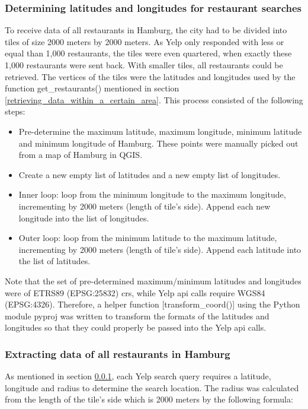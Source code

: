 \documentclass[a4paper, 11pt, oneside]{Thesis}  %
\begin{document}
\subsubsection{Determining latitudes and longitudes for restaurant searches}
\label{Determining_latitudes_and_longitudes_for_restaurant_searches}

To receive data of all restaurants in Hamburg, the city had to be divided into tiles of size 2000 meters by 2000 meters. As Yelp only responded with less or equal than 1,000 restaurants, the tiles were even quartered, when exactly these 1,000 restaurants were sent back. With smaller tiles, all restaurants could be retrieved. The vertices of the tiles were the latitudes and longitudes used by the function get\_restaurants() mentioned in section \ref{retrieving_data_within_a_certain_area}. This process consisted of the following steps:
\begin{itemize}
\item Pre-determine the maximum latitude, maximum longitude, minimum latitude and minimum longitude of Hamburg. These points were manually picked out from a map of Hamburg in QGIS.
\item Create a new empty list of latitudes and a new empty list of longitudes.
\item Inner loop: loop from the minimum longitude to the maximum longitude, incrementing by 2000 meters (length of tile’s side). Append each new longitude into the list of longitudes.
\item Outer loop: loop from the minimum latitude to the maximum latitude, incrementing by 2000 meters (length of tile’s side). Append each latitude into the list of latitudes.
\end{itemize}

Note that the set of pre-determined maximum/minimum latitudes and longitudes were of ETRS89 (EPSG:25832) \ac{crs}, while Yelp \ac{api} calls require WGS84 (EPSG:4326). Therefore, a helper function [transform\_coord()] using the Python module pyproj \cite{JeffWhitaker.2018} was written to transform the formats of the latitudes and longitudes so that they could properly be passed into the Yelp \ac{api} calls.

\subsubsection{Extracting data of all restaurants in Hamburg}
As mentioned in section \ref{Determining_latitudes_and_longitudes_for_restaurant_searches}, each Yelp search query requires a latitude, longitude and radius to determine the search location.
The radius was calculated from the length of the tile’s side which is 2000 meters by the following formula:
\end{document}
